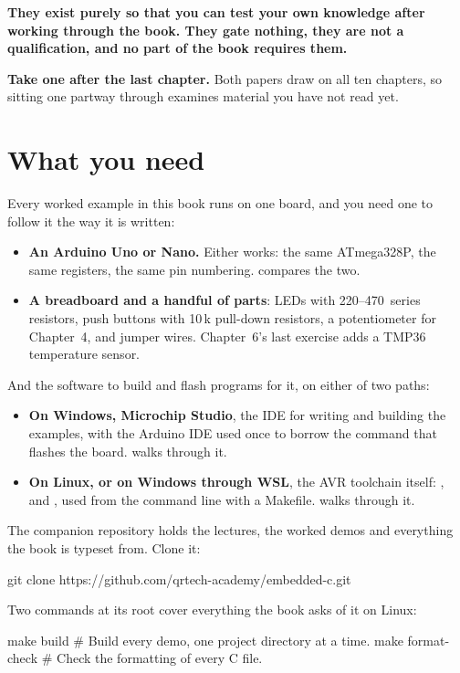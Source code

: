\textbf{They exist purely so that you can test your own knowledge after working through the book.
They gate nothing, they are not a qualification, and no part of the book requires them.}

\textbf{Take one after the last chapter.} Both papers draw on all ten chapters, so sitting one
partway through examines material you have not read yet.

\section*{What you need}
Every worked example in this book runs on one board, and you need one to follow it the way it is
written:
\begin{itemize}
  \item \textbf{An Arduino Uno or Nano.} Either works: the same ATmega328P, the same registers, the
    same pin numbering.  compares the two.
  \item \textbf{A breadboard and a handful of parts}: LEDs with 220--470\,\textohm{} series
    resistors, push buttons with 10\,k\textohm{} pull-down resistors, a potentiometer for
    Chapter~4, and jumper wires. Chapter~6's last exercise adds a TMP36 temperature sensor.
\end{itemize}
And the software to build and flash programs for it, on either of two paths:
\begin{itemize}
  \item \textbf{On Windows, Microchip Studio}, the IDE for writing and building the examples, with
    the Arduino IDE used once to borrow the command that flashes the board.  walks
    through it.
  \item \textbf{On Linux, or on Windows through WSL}, the AVR toolchain itself: ,
     and , used from the command line with a Makefile.
     walks through it.
\end{itemize}
The companion repository holds the lectures, the worked demos and everything the book is typeset
from. Clone it:

\begin{shell}
git clone https://github.com/qrtech-academy/embedded-c.git
\end{shell}

\noindent Two commands at its root cover everything the book asks of it on Linux:

\begin{shell}
make build               # Build every demo, one project directory at a time.
make format-check        # Check the formatting of every C file.
\end{shell}


